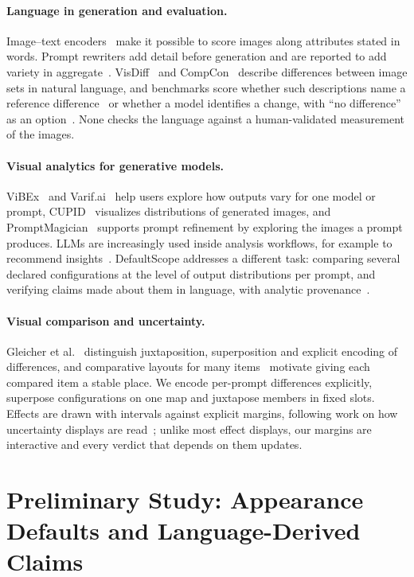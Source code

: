 \documentclass[review]{vgtc}                 %
\newcommand{\sysname}{DefaultScope}
\begin{document}
\paragraph{Language in generation and evaluation.}
Image--text encoders~\cite{clip,siglip2} make it possible to score images along attributes stated in words. Prompt rewriters add detail before generation and are reported to add variety in aggregate~\cite{promptexpansion,promptmodifier}. VisDiff~\cite{visdiff} and CompCon~\cite{compcon} describe differences between image sets in natural language, and benchmarks score whether such descriptions name a reference difference~\cite{visdiff} or whether a model identifies a change, with ``no difference'' as an option~\cite{vdiffbench}. None checks the language against a human-validated measurement of the images.

\paragraph{Visual analytics for generative models.}
ViBEx~\cite{vibex} and Varif.ai~\cite{varifai} help users explore how outputs vary for one model or prompt, CUPID~\cite{cupid} visualizes distributions of generated images, and PromptMagician~\cite{promptmagician} supports prompt refinement by exploring the images a prompt produces. LLMs are increasingly used inside analysis workflows, for example to recommend insights~\cite{leva}. \sysname{} addresses a different task: comparing several declared configurations at the level of output distributions per prompt, and verifying claims made about them in language, with analytic provenance~\cite{ragan}.

\paragraph{Visual comparison and uncertainty.}
Gleicher et al.~\cite{gleicher2011,gleicher} distinguish juxtaposition, superposition and explicit encoding of differences, and comparative layouts for many items~\cite{lyi} motivate giving each compared item a stable place. We encode per-prompt differences explicitly, superpose configurations on one map and juxtapose members in fixed slots. Effects are drawn with intervals against explicit margins, following work on how uncertainty displays are read~\cite{hullman}; unlike most effect displays, our margins are interactive and every verdict that depends on them updates.

\section{Preliminary Study: Appearance Defaults and Language-Derived Claims}
\label{sec:study}
\end{document}

